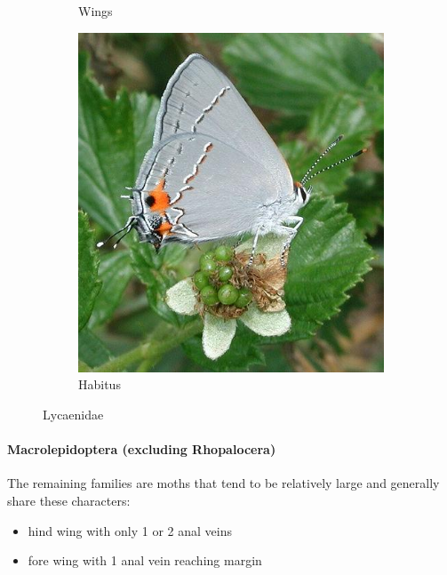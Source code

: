 \documentclass[letterpaper, 11pt]{article}
\begin{document}
\begin{figure}[ht!]
\begin{subfigure}[ht!]{0.28\textwidth}
        \caption{Wings}
        \label{fig:lycaenid1}
    \end{subfigure}
    \qquad %
    \begin{subfigure}[ht!]{0.4\textwidth}
        \includegraphics[width=\textwidth]{image12}
        \caption{Habitus}
        \label{fig:lycaenid2}
    \end{subfigure}
    \caption{Lycaenidae}\label{fig:lycaenids}
\end{figure}

\paragraph{Macrolepidoptera (excluding Rhopalocera)} The remaining families are moths that tend to be relatively large and generally share these characters: 
\begin{itemize}
\item hind wing with only 1 or 2 anal veins
\item fore wing with 1 anal vein reaching margin
\end{itemize}
\end{document}
